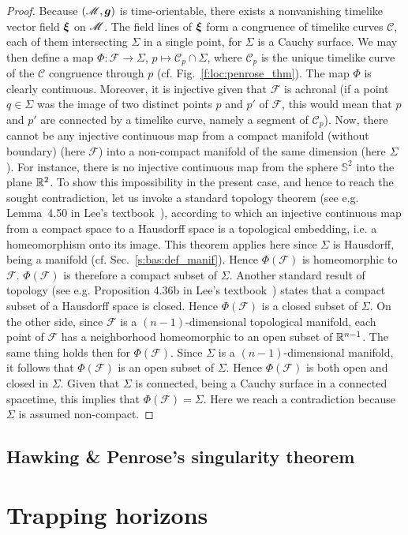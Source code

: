 \begin{proof}
Because $(\mathscr{M},\bm{g})$ is time-orientable, there exists a nonvanishing
timelike vector field $\bm{\xi}$ on $\mathscr{M}$. The field lines of $\bm{\xi}$
form a congruence of timelike curves $\mathscr{C}$, each of them intersecting
$\Sigma$ in a single point, for $\Sigma$ is a Cauchy surface.
We may then define a map $\Phi: \mathscr{F} \to \Sigma$,
$p \mapsto \mathscr{C}_p \cap \Sigma$, where $\mathscr{C}_p$ is the unique
timelike curve of the $\mathscr{C}$ congruence through $p$ (cf. Fig.~\ref{f:loc:penrose_thm}).
The map $\Phi$ is clearly continuous. Moreover, it is injective given that
$\mathscr{F}$ is achronal (if a point $q\in\Sigma$ was the image of two distinct
points $p$ and $p'$ of $\mathscr{F}$, this would mean that $p$ and $p'$
are connected by a timelike curve, namely a segment of $\mathscr{C}_p$).
Now, there cannot be any injective continuous map from a
compact manifold (without boundary) (here $\mathscr{F}$)
into a non-compact manifold of the same dimension (here $\Sigma$). For instance,
there is no injective continuous map from the sphere $\mathbb{S}^2$ into
the plane $\mathbb{R}^2$. To show this impossibility in the present case, and hence
to reach the sought contradiction, let us invoke a
standard topology theorem (see e.g. Lemma~4.50
in Lee's textbook~\cite{Lee11}), according to which an injective continuous map
from a compact space to a Hausdorff space
is a topological embedding, i.e. a homeomorphism onto its image. This theorem applies here
since $\Sigma$ is Hausdorff, being a manifold (cf. Sec.~\ref{s:bas:def_manif}).
Hence $\Phi(\mathscr{F})$ is homeomorphic to $\mathscr{F}$.
$\Phi(\mathscr{F})$ is therefore a compact subset of $\Sigma$.
Another standard result of topology (see e.g. Proposition 4.36b in Lee's textbook~\cite{Lee11})
states that a compact subset of a Hausdorff space is closed. Hence $\Phi(\mathscr{F})$
is a closed subset of $\Sigma$.
On the other side, since $\mathscr{F}$ is a $(n-1)$-dimensional topological manifold,
each point of $\mathscr{F}$
has a neighborhood homeomorphic to an open subset of $\mathbb{R}^{n-1}$. The same thing holds then for
$\Phi(\mathscr{F})$. Since $\Sigma$ is a $(n-1)$-dimensional manifold, it follows that
$\Phi(\mathscr{F})$ is an open subset of $\Sigma$. Hence $\Phi(\mathscr{F})$ is both open
and closed in $\Sigma$. Given that $\Sigma$ is connected, being a Cauchy surface in
a connected spacetime, this implies that
$\Phi(\mathscr{F}) = \Sigma$. Here we reach a contradiction because $\Sigma$
is assumed non-compact.
\end{proof}

\subsection{Hawking \& Penrose's singularity theorem}



\section{Trapping horizons}



